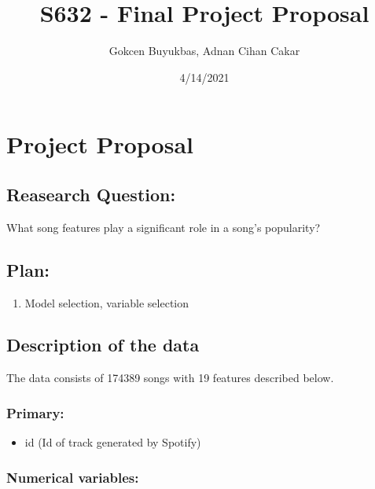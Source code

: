 \documentclass[
]{article}
\title{S632 - Final Project Proposal}
\author{Gokcen Buyukbas, Adnan Cihan Cakar}
\date{4/14/2021}
\providecommand{\tightlist}{%
  \setlength{\itemsep}{0pt}\setlength{\parskip}{0pt}}
\begin{document}
\maketitle

\hypertarget{project-proposal}{%
\section{Project Proposal}\label{project-proposal}}

\hypertarget{reasearch-question}{%
\subsection{Reasearch Question:}\label{reasearch-question}}

What song features play a significant role in a song's popularity?

\hypertarget{plan}{%
\subsection{Plan:}\label{plan}}

\begin{enumerate}
\def\labelenumi{\arabic{enumi}.}
\tightlist
\item
  Model selection, variable selection
\end{enumerate}

\hypertarget{description-of-the-data}{%
\subsection{Description of the data}\label{description-of-the-data}}

The data consists of 174389 songs with 19 features described below.

\hypertarget{primary}{%
\subsubsection{Primary:}\label{primary}}

\begin{itemize}
\tightlist
\item
  id (Id of track generated by Spotify)
\end{itemize}

\hypertarget{numerical-variables}{%
\subsubsection{Numerical variables:}\label{numerical-variables}}
\end{document}
